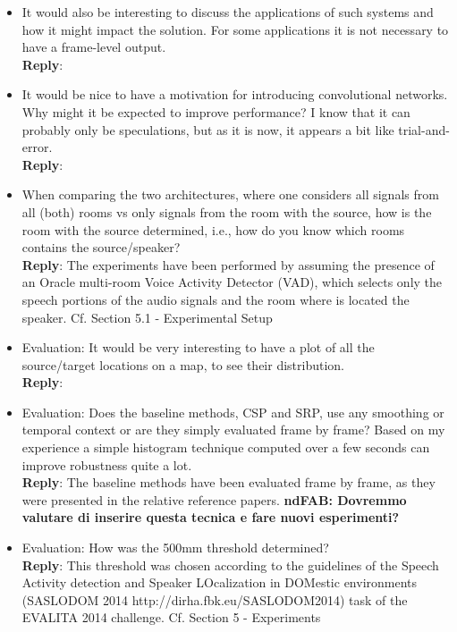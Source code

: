 \documentclass[11pt, technote, letterpaper, oneside, onecolumn]{IEEEtran}
\begin{document}
\begin{itemize}
\item It would also be interesting to discuss the applications of such systems and how it might impact the solution. For some applications it is not necessary to have a frame-level output.\\
\textbf{Reply}:

\item It would be nice to have a motivation for introducing convolutional networks. Why might it be expected to improve performance? I know that it can probably only be speculations, but as it is now, it appears a bit like trial-and-error.\\
\textbf{Reply}:

\item When comparing the two architectures, where one considers all signals from all (both) rooms vs only signals from the room with the source, how is the room with the source determined, i.e., how do you know which rooms contains the source/speaker?\\
\textbf{Reply}: The experiments have been performed by assuming the presence of an Oracle multi-room Voice Activity Detector (VAD), which selects only the speech portions of the audio signals and the room where is located the speaker. Cf. Section 5.1 - Experimental Setup

\item Evaluation: It would be very interesting to have a plot of all the source/target locations on a map, to see their distribution.\\
\textbf{Reply}:

\item Evaluation: Does the baseline methods, CSP and SRP, use any smoothing or temporal context or are they simply evaluated frame by frame? Based on my experience a simple histogram technique computed over a few seconds can improve robustness quite a lot.\\
\textbf{Reply}: The baseline methods have been evaluated frame by frame, as they were presented in the relative reference papers. \textbf{ndFAB: Dovremmo valutare di inserire questa tecnica e fare nuovi esperimenti?}

\item Evaluation: How was the 500mm threshold determined?\\
\textbf{Reply}: This threshold was chosen according to the guidelines of the Speech Activity detection and Speaker LOcalization in DOMestic environments (SASLODOM 2014 http://dirha.fbk.eu/SASLODOM2014) task of the EVALITA 2014 challenge. Cf. Section 5 - Experiments


\end{itemize}
\end{document}
